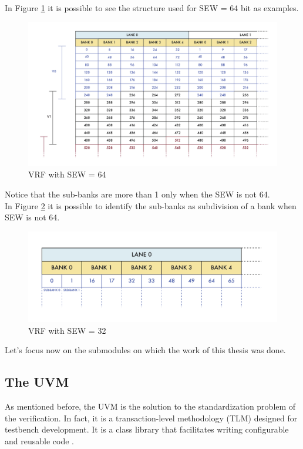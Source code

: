 In Figure \ref{vrf-64} it is possible to see the structure used for SEW = 64 bit as examples.
\begin{figure}[H]
    \centering
    \includegraphics[scale = 0.45]{Chapter_1/img/vrf-64.png}
    \caption{VRF with SEW = 64}
    \label{vrf-64}
\end{figure}

Notice that the sub-banks are more than 1 only when the SEW is not 64. \\

In Figure \ref{vrf-32} it is possible to identify the sub-banks as subdivision of a bank when SEW is not 64.
\begin{figure}[H]
    \centering
    \includegraphics[scale = 0.7]{Chapter_1/img/vrf-32.png}
    \caption{VRF with SEW = 32}
    \label{vrf-32}
\end{figure}

Let's focus now on the submodules on which the work of this thesis was done.




\subsection{The UVM}
As mentioned before, the UVM is the solution to the standardization problem of the verification. In fact, it is a transaction-level methodology (TLM) designed for testbench development. It is a class library that facilitates writing configurable and reusable code \cite{verification-book-2018}.

